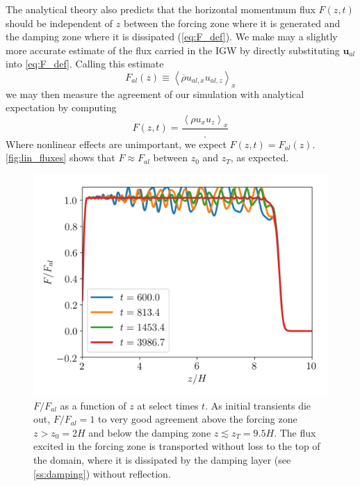 \documentclass[
        fleqn,
        usenatbib,
    ]{mnras}
\newcommand*{\ev}[1]{\left\langle#1\right\rangle}
\newcommand*{\bm}[1]{\mathbf{#1}}
\begin{document}
The analytical theory also predicts that the horizontal momentmum flux $F(z, t)$
should be independent of $z$ between the forcing zone where it is generated and
the damping zone where it is dissipated (\autoref{eq:F_def}). We make may a
slightly more accurate estimate of the flux carried in the IGW by directly
substituting $\bm{u}_{al}$ into \autoref{eq:F_def}. Calling this estimate
\begin{equation}
    F_{al}(z) \equiv \ev{\overline{\rho} u_{al,x}u_{al,z}}_x
\end{equation}
we may then measure the agreement of our simulation with analytical expectation
by computing
\begin{equation}
    F(z, t) = \frac{\ev{\rho u_xu_z}_x}.\label{eq:sbm_def}
\end{equation}
Where nonlinear effects are unimportant, we expect $F(z, t) = F_{al}(z)$.
\autoref{fig:lin_fluxes} shows that $F \approx F_{al}$ between $z_0$ and
$z_T$, as expected.
\begin{figure}
    \centering
    \includegraphics[width=\columnwidth]{plots/lin_fluxes.png}
    \caption{$F/F_{al}$ as a function of $z$ at select times $t$. As
    initial transients die out, $F / F_{al} = 1$ to very good agreement above
    the forcing zone $z > z_0 = 2H$ and below the damping zone $z \lesssim z_T =
    9.5H$. The flux excited in the forcing zone is transported without loss to
    the top of the domain, where it is dissipated by the damping layer (see
    \autoref{ss:damping}) without reflection.}\label{fig:lin_fluxes}
\end{figure}
\end{document}

